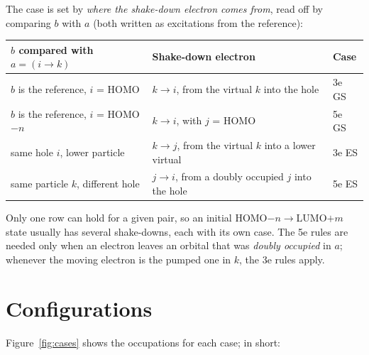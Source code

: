 \documentclass[11pt]{article}
\begin{document}
The case is set by \emph{where the shake-down electron comes from}, read off by comparing
$b$ with $a$ (both written as excitations from the reference):

\begin{center}
\begin{tabular}{@{}lll@{}}
\toprule
$b$ compared with $a=(i\to k)$ & Shake-down electron & Case \\
\midrule
$b$ is the reference, $i$ = HOMO & $k\to i$, from the virtual $k$ into the hole & 3e GS \\
$b$ is the reference, $i$ = HOMO$-n$ & $k\to i$, with $j$ = HOMO & 5e GS \\
same hole $i$, lower particle & $k\to j$, from the virtual $k$ into a lower virtual & 3e ES \\
same particle $k$, different hole & $j\to i$, from a doubly occupied $j$ into the hole & 5e ES \\
\bottomrule
\end{tabular}
\end{center}

Only one row can hold for a given pair, so an initial HOMO$-n\to$LUMO$+m$ state usually
has several shake-downs, each with its own case. The 5e rules are needed only when an
electron leaves an orbital that was \emph{doubly occupied} in $a$; whenever the moving
electron is the pumped one in $k$, the 3e rules apply.

\section{Configurations}

Figure~\ref{fig:cases} shows the occupations for each case; in short:
\end{document}
